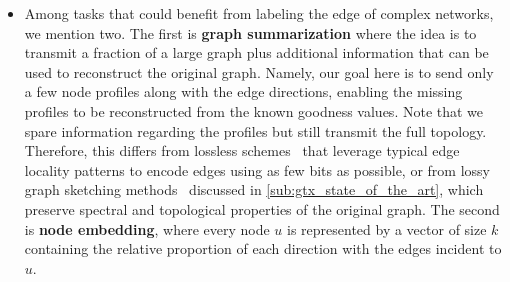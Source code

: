 \begin{itemize}[leftmargin=*]
  \item Among tasks that could benefit from labeling the edge of complex networks, we mention two.
    The first is \textbf{graph summarization} where the idea is to transmit a fraction of a large
    graph plus additional information that can be used to reconstruct the original graph. Namely,
    our goal here is to send only a few node profiles along with the edge directions, enabling the
    missing profiles to be reconstructed from the known goodness values. Note that we spare
    information regarding the profiles but still transmit the full topology. Therefore, this differs
    from lossless schemes~\autocites{compressSN09}{compressSN12} that leverage typical edge locality
    patterns to encode edges using as few bits as possible, or from lossy graph sketching
    methods~\autocite{graphSketch12} discussed in \autoref{sub:gtx_state_of_the_art}, which preserve
    spectral and topological properties of the original graph.
    The second is \textbf{node embedding}, where every node $u$ is represented by a vector of size
    $k$ containing the relative proportion of each direction with the edges incident to $u$.
\end{itemize}
